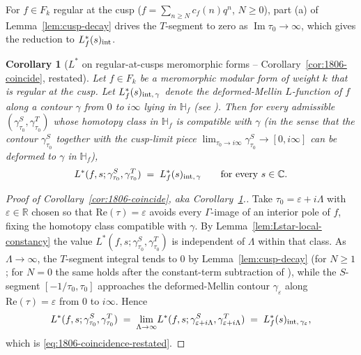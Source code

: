 \documentclass[11pt]{article}
\newtheorem{corollary}[theorem]{Corollary}
\numberwithin{equation}{section}  %
\newcommand{\HH}{\mathbb{H}}
\newcommand{\CC}{\mathbb{C}}
\newcommand{\RR}{\mathbb{R}}
\newcommand{\eps}{\varepsilon}
\DeclareMathOperator{\im}{Im}
\begin{document}
For $f \in F_k$ regular at the cusp ($f = \sum_{n \ge N}c_f(n)q^n$,
$N \ge 0$), part (a) of Lemma~\ref{lem:cusp-decay} drives the
$T$-segment to zero as $\im\tau_0 \to \infty$, which gives the
reduction to $L_f^*(s)_{\rm int}$.

\begin{corollary}[$L^*$ on regular-at-cusps meromorphic forms -- Corollary~\ref{cor:1806-coincide}, restated]\label{cor:1806-coincide2}
Let $f \in F_k$ be a meromorphic modular form of weight $k$ that is
regular at the cusp.  Let $L_f^*(s)_{\rm int,\,\gamma}$ denote the
deformed-Mellin $L$-function of $f$ along a contour $\gamma$ from
$0$ to $i\infty$ lying in $\HH_f$ (see \cite[\S2]{1806}).  Then for
every admissible $(\gamma^S_{\tau_0}, \gamma^T_{\tau_0})$ whose
homotopy class in $\HH_f$ is compatible with $\gamma$ (in the sense
that the contour $\gamma^S_{\tau_0}$ together with the cusp-limit
piece $\lim_{\tau_0 \to i\infty}\gamma^S_{\tau_0} \to [0, i\infty]$
can be deformed to $\gamma$ in $\HH_f$),
\begin{equation}\label{eq:1806-coincidence-restated}
  L^*(f, s; \gamma^S_{\tau_0}, \gamma^T_{\tau_0})
  \;=\; L_f^*(s)_{\rm int,\,\gamma}
  \qquad
  \text{for every } s \in \CC.
\end{equation}
\end{corollary}
\begin{proof}[Proof of Corollary~\ref{cor:1806-coincide}, aka Corollary~\ref{cor:1806-coincide2}.]
Take $\tau_0 = \eps + i\Lambda$ with $\eps \in \RR$ chosen so that
$\mathrm{Re}(\tau) = \eps$ avoids every $\Gamma$-image of an interior
pole of $f$, fixing the homotopy class compatible with $\gamma$.  By
Lemma~\ref{lem:Lstar-local-constancy} the value
$L^*(f, s; \gamma^S_{\tau_0}, \gamma^T_{\tau_0})$ is independent of
$\Lambda$ within that class.  As $\Lambda \to \infty$, the $T$-segment
integral tends to $0$ by Lemma~\ref{lem:cusp-decay} (for $N \ge 1$;
for $N = 0$ the same holds after the constant-term subtraction of
\cite[Lemma~2.1]{1806}), while the $S$-segment $[-1/\tau_0, \tau_0]$
approaches the deformed-Mellin contour $\gamma_\eps$ along
$\mathrm{Re}(\tau) = \eps$ from $0$ to $i\infty$.  Hence
\begin{equation}
  L^*(f, s; \gamma^S_{\tau_0}, \gamma^T_{\tau_0})
  \;=\; \lim_{\Lambda \to \infty}\!L^*(f, s; \gamma^S_{\eps + i\Lambda}, \gamma^T_{\eps + i\Lambda})
  \;=\; L_f^*(s)_{\rm int,\,\gamma_\eps},
\end{equation}
which is \eqref{eq:1806-coincidence-restated}.
\end{proof}
\end{document}
